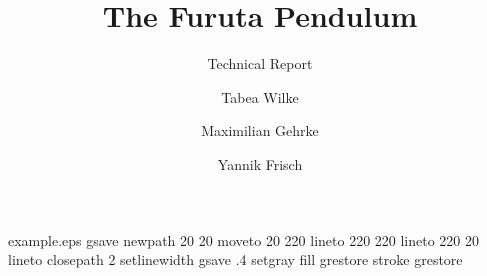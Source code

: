 %
%
%
%
%
\begin{filecontents*}{example.eps}
gsave
newpath
  20 20 moveto
  20 220 lineto
  220 220 lineto
  220 20 lineto
closepath
2 setlinewidth
gsave
  .4 setgray fill
grestore
stroke
grestore
\end{filecontents*}
%
\RequirePackage{fix-cm}
%
\documentclass[smallextended]{svjour3}       %
%
\smartqed  %
%
\usepackage{graphicx}
\usepackage[numbers]{natbib} %

%
 \usepackage{mathptmx}      %
%
\usepackage{amsmath}
%
%
%


\title{The Furuta Pendulum
}
\subtitle{Technical Report}


\author{Tabea Wilke \and Maximilian Gehrke \and Yannik Frisch %
}


